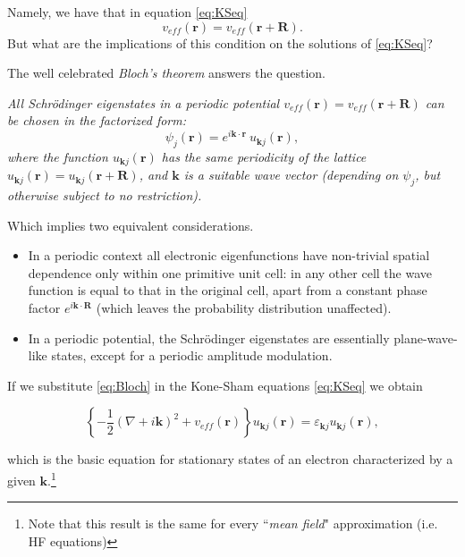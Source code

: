 \documentclass[a4paper,12pt]{article}
\newcommand\mf[1]{\mathbf{#1}}
\newcommand\erre{\mathbf{r}}
\begin{document}
Namely, we have that in equation \eqref{eq:KSeq} 
\begin{equation}
	v_{eff}(\erre) = 	v_{eff}(\erre + \mf{R}).
\end{equation}
But what are the implications of this condition on the solutions of \eqref{eq:KSeq}?

The well celebrated \textit{Bloch's theorem} \cite[p.136]{Manini} answers the question.

\begin{center}
\begin{framed}

\textit{All Schr\"odinger eigenstates in a periodic potential $v_{eff}(\erre) = 	v_{eff}(\erre + \mf{R})$ can be chosen in the factorized form:}
\begin{equation}\label{eq:Bloch}
		\psi_{j}(\erre) = e^{i \mf{k} \cdot \erre } ~ u_{\mf{k}j}(\erre), 
\end{equation}
\textit{where the function $u_{\mf{k}j}(\erre)$ has the same periodicity of the lattice $u_{\mf{k}j}(\erre) = u_{\mf{k}j}(\erre + \mf{R}) $, and $\mf{k}$ is a suitable wave vector (depending on $\psi_j$, but otherwise subject to no restriction).}
\end{framed}
\end{center}

Which implies two equivalent considerations.
\begin{itemize}
	\item In a periodic context all electronic eigenfunctions have non-trivial spatial  dependence only within one primitive unit cell: in any other cell the wave function is equal to that in the original cell, apart from a constant phase factor $e^{i \mf{k} \cdot \mf{R}}$ (which leaves the probability distribution unaffected).
	\item In a periodic potential, the Schr\"odinger eigenstates are essentially plane-wave-like states, except for a periodic amplitude modulation.
\end{itemize}

If we substitute \eqref{eq:Bloch} in the Kone-Sham equations \eqref{eq:KSeq} we obtain \cite[p.137]{Manini}
\begin{framed}
\begin{equation}\label{eq:BlochEq}
	\left\lbrace -\frac{1}{2}  \left( \nabla + i\mf{k} \right)^2 + v_{eff}(\erre) \right\rbrace u_{\mf{k}j}(\erre) = \varepsilon_{\mf{k}j}  u_{\mf{k}j}(\erre),
\end{equation}
\end{framed}
which is the basic equation for stationary states of an electron characterized by a given $\mf{k}$.\footnote{Note that this result is the same for every ``\textit{mean field}" approximation (i.e. HF equations)}
\end{document}

